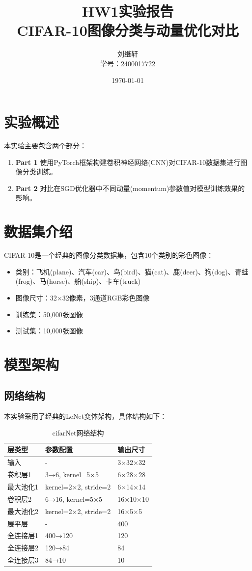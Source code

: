 \documentclass[12pt,a4paper,UTF8]{ctexart}
\title{HW1实验报告\\CIFAR-10图像分类与动量优化对比}
\author{刘继轩 \\ 学号：2400017722}
\date{\today}
\begin{document}
\maketitle

\section{实验概述}
本实验主要包含两个部分：
\begin{enumerate}
    \item \textbf{Part 1} 使用PyTorch框架构建卷积神经网络(CNN)对CIFAR-10数据集进行图像分类训练。
    \item \textbf{Part 2} 对比在SGD优化器中不同动量(momentum)参数值对模型训练效果的影响。
\end{enumerate}

\section{数据集介绍}
CIFAR-10是一个经典的图像分类数据集，包含10个类别的彩色图像：
\begin{itemize}
    \item 类别：飞机(plane)、汽车(car)、鸟(bird)、猫(cat)、鹿(deer)、狗(dog)、青蛙(frog)、马(horse)、船(ship)、卡车(truck)
    \item 图像尺寸：32×32像素，3通道RGB彩色图像
    \item 训练集：50,000张图像
    \item 测试集：10,000张图像
\end{itemize}

\section{模型架构}
\subsection{网络结构}
本实验采用了经典的LeNet变体架构，具体结构如下：

\begin{table}[H]
\centering
\caption{cifarNet网络结构}
\begin{tabular}{@{}lll@{}}
\toprule
层类型 & 参数配置 & 输出尺寸 \\
\midrule
输入 & - & 3×32×32 \\
卷积层1 & 3→6, kernel=5×5 & 6×28×28 \\
最大池化1 & kernel=2×2, stride=2 & 6×14×14 \\
卷积层2 & 6→16, kernel=5×5 & 16×10×10 \\
最大池化2 & kernel=2×2, stride=2 & 16×5×5 \\
展平层 & - & 400 \\
全连接层1 & 400→120 & 120 \\
全连接层2 & 120→84 & 84 \\
全连接层3 & 84→10 & 10 \\
\bottomrule
\end{tabular}
\end{table}
\end{document}

